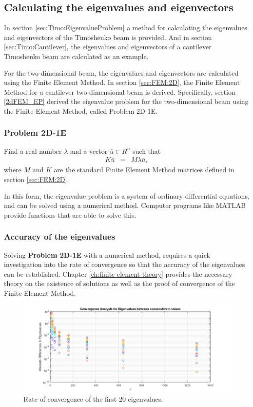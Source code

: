 	\subsection{Calculating the eigenvalues and eigenvectors}
	In section \ref{sec:Timo:EigenvalueProblem} a method for calculating the eigenvalues and eigenvectors of the Timoshenko beam is provided. And in section \ref{sec:Timo:Cantilever}, the eigenvalues and eigenvectors of a cantilever Timoshenko beam are calculated as an example. 

	For the two-dimensional beam, the eigenvalues and eigenvectors are calculated using the Finite Element Method. In section \ref{sec:FEM:2D}, the Finite Element Method for a cantilever two-dimensional beam is derived. Specifically, section \ref{2dFEM_EP} derived the eigenvalue problem for the two-dimensional beam using the Finite Element Method, called Problem 2D-1E.

	\subsubsection{Problem 2D-1E}
	Find a real number $\lambda$ and a vector $\bar{u} \in R^n$ such that
	\begin{eqnarray}
		K\bar{u} & = & M\lambda{\bar{u}},
	\end{eqnarray} where $M$ and $K$ are the standard Finite Element Method matrices defined in section \ref{sec:FEM:2D}.

	In this form, the eigenvalue problem is a system of ordinary differential equations, and can be solved using a numerical method. Computer programs like MATLAB provide functions that are able to solve this.

	\subsubsection{Accuracy of the eigenvalues}
	Solving \textbf{Problem 2D-1E} with a numerical method, requires a quick investigation into the rate of convergence so that the accuracy of the eigenvalues can be established. Chapter \ref{ch:finite-element-theory} provides the necessary theory on the existence of solutions as well as the proof of convergence of the Finite Element Method.

	\begin{figure}[H]
		\centering
		\begin{adjustbox}{center}
			\includegraphics[scale=0.7]{files/Chapter4/Convergence.png}
		\end{adjustbox}
		\caption{Rate of convergence of the first 20 eigenvalues.}
		\label{fig:conv_2d_eig}
	\end{figure}


